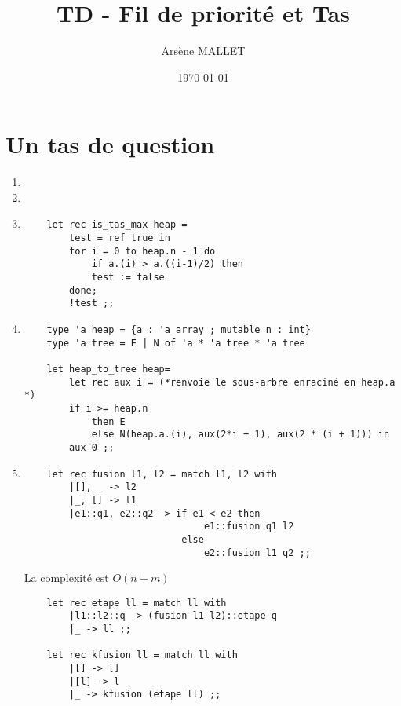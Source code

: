 \documentclass{article}
\title{TD - Fil de priorité et Tas}
\date{\today}
\author{Arsène MALLET}
\newcommand{\image}[3]{ %
    \begin{minipage}[t]{\linewidth}
        #1
              \adjustbox{valign=t}{%
                \texttt{[image: \#3]}%
              }
    \end{minipage}}
\begin{document}
\thispagestyle{firstpage}

\begin{center}
    \huge\bfseries{\@title}
\end{center}

\section{Un tas de question}

\begin{enumerate}

\item \image{\raggedright}{0.6}{drawing/I_1.pdf}

\item

\item \begin{verbatim}
    let rec is_tas_max heap = 
        test = ref true in
        for i = 0 to heap.n - 1 do
            if a.(i) > a.((i-1)/2) then
            test := false
        done;
        !test ;;
\end{verbatim}

\item \begin{verbatim}
    type 'a heap = {a : 'a array ; mutable n : int}
    type 'a tree = E | N of 'a * 'a tree * 'a tree

    let heap_to_tree heap=
        let rec aux i = (*renvoie le sous-arbre enraciné en heap.a *)
        if i >= heap.n
            then E
            else N(heap.a.(i), aux(2*i + 1), aux(2 * (i + 1))) in
        aux 0 ;;
\end{verbatim}


\item \begin{verbatim}
    let rec fusion l1, l2 = match l1, l2 with
        |[], _ -> l2
        |_, [] -> l1
        |e1::q1, e2::q2 -> if e1 < e2 then
                                e1::fusion q1 l2
                            else
                                e2::fusion l1 q2 ;;
\end{verbatim}

La complexité est $O(n+m)$

\image{\centering}{0.8}{drawing/I_5.pdf}

\begin{verbatim}
    let rec etape ll = match ll with
        |l1::l2::q -> (fusion l1 l2)::etape q
        |_ -> ll ;;

    let rec kfusion ll = match ll with
        |[] -> []
        |[l] -> l
        |_ -> kfusion (etape ll) ;;
\end{verbatim}

\end{enumerate}
\end{document}
